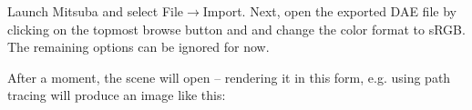 \begin{center}
\end{center}
Launch Mitsuba and select File$\to$Import. Next, open the exported DAE file by clicking on the topmost browse button and and change the color format to sRGB. The remaining options can be ignored for now.
\begin{center}
\end{center}
After a moment, the scene will open -- rendering it in this form, e.g. using path tracing will produce an image like this:
